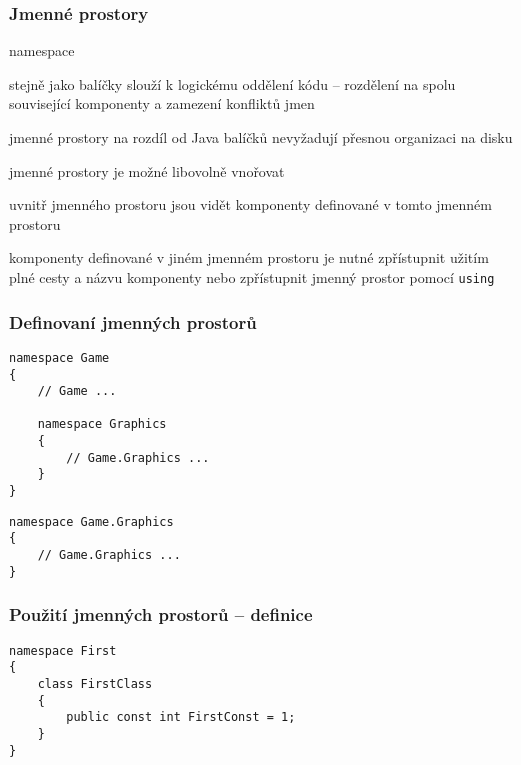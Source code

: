 
\begin{frame}[fragile]
\frametitle{Jmenné prostory}

\begin{bitemize}{namespace}
\item stejně jako balíčky slouží k logickému oddělení kódu -- rozdělení na spolu související komponenty a zamezení konfliktů jmen
\item jmenné prostory na rozdíl od Java balíčků nevyžadují přesnou organizaci na disku
\item jmenné prostory je možné libovolně vnořovat
\item uvnitř jmenného prostoru jsou vidět komponenty definované v tomto jmenném prostoru
\item []
\item komponenty definované v jiném jmenném prostoru je nutné zpřístupnit užitím plné cesty a názvu komponenty nebo zpřístupnit jmenný prostor pomocí \lstinline|using|
\end{bitemize}
\end{frame}


\begin{frame}[fragile]
\frametitle{Definovaní jmenných prostorů}

\begin{yesblock}
\begin{lstlisting}
namespace Game
{
    // Game ...

    namespace Graphics
    {
        // Game.Graphics ...
    }
}
\end{lstlisting}
\end{yesblock}
\vfill
\begin{yesblock}
\begin{lstlisting}
namespace Game.Graphics
{
    // Game.Graphics ...
}
\end{lstlisting}
\end{yesblock}
\end{frame}




\begin{frame}[fragile]
\frametitle{Použití jmenných prostorů -- definice}

\begin{yesblock}
\begin{lstlisting}
namespace First
{
    class FirstClass
    {
        public const int FirstConst = 1;
    }
}
\end{lstlisting}
\end{yesblock}
\end{frame}




